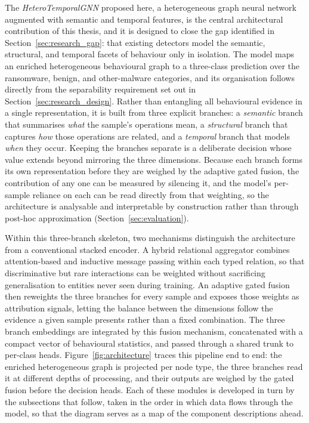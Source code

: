 \documentclass[%
    BCOR=10mm,
    DIV=13,
    toc=bibliography,
    toc=listof,
    oneside,
    12pt,
]{scrbook}
\begin{document}
The \emph{HeteroTemporalGNN} proposed here, a heterogeneous graph neural network
augmented with semantic and temporal features, is the central architectural
contribution of this thesis, and it is designed to close the gap identified in
Section~\ref{sec:research_gap}: that existing detectors model the semantic,
structural, and temporal facets of behaviour only in isolation. The model maps
an enriched heterogeneous behavioural graph to a three-class prediction over
the ransomware, benign, and other-malware categories, and its organisation
follows directly from the separability requirement set out in
Section~\ref{sec:research_design}. Rather than entangling all behavioural
evidence in a single representation, it is built from three explicit branches:
a \emph{semantic} branch that summarises \emph{what} the sample's operations
mean, a \emph{structural} branch that captures \emph{how} those operations are
related, and a \emph{temporal} branch that models \emph{when} they occur.
Keeping the branches separate is a deliberate decision whose value extends
beyond mirroring the three dimensions. Because each branch forms its own
representation before they are weighed by the adaptive gated fusion, the
contribution of any one can be measured by silencing it, and the model's
per-sample reliance on each can be read directly from that weighting, so the
architecture is analysable and interpretable by construction rather than
through post-hoc approximation (Section~\ref{sec:evaluation}).

Within this three-branch skeleton, two mechanisms distinguish the architecture
from a conventional stacked encoder. A hybrid relational aggregator combines
attention-based and inductive message passing within each typed relation, so
that discriminative but rare interactions can be weighted without sacrificing
generalisation to entities never seen during training. An adaptive gated
fusion then reweights the three branches for every sample and exposes those
weights as attribution signals, letting the balance between the dimensions
follow the evidence a given sample presents rather than a fixed combination.
The three branch embeddings are integrated by this fusion mechanism,
concatenated with a compact vector of behavioural statistics, and passed
through a shared trunk to per-class heads. Figure~\ref{fig:architecture} traces
this pipeline end to end: the enriched heterogeneous graph is projected per node
type, the three branches read it at different depths of processing, and their
outputs are weighed by the gated fusion before the decision heads. Each of
these modules is developed in turn by the subsections that follow, taken in the
order in which data flows through the model, so that the diagram serves as a map
of the component descriptions ahead.
\end{document}
